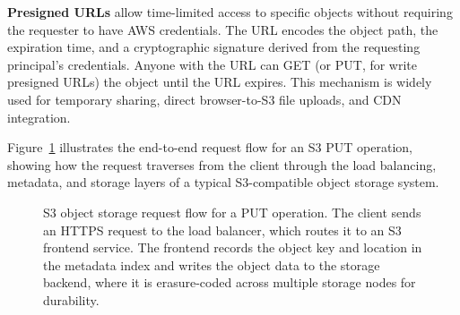 \textbf{Presigned URLs} allow time-limited access to specific objects without requiring the requester to have AWS credentials. The URL encodes the object path, the expiration time, and a cryptographic signature derived from the requesting principal's credentials. Anyone with the URL can GET (or PUT, for write presigned URLs) the object until the URL expires. This mechanism is widely used for temporary sharing, direct browser-to-S3 file uploads, and CDN integration.

Figure~\ref{fig:s3-request-flow} illustrates the end-to-end request flow for an S3 PUT operation, showing how the request traverses from the client through the load balancing, metadata, and storage layers of a typical S3-compatible object storage system.

\begin{figure}[htbp]
\centering
{}
\caption{S3 object storage request flow for a PUT operation. The client sends an HTTPS request to the load balancer, which routes it to an S3 frontend service. The frontend records the object key and location in the metadata index and writes the object data to the storage backend, where it is erasure-coded across multiple storage nodes for durability.}
\label{fig:s3-request-flow}
\end{figure}

